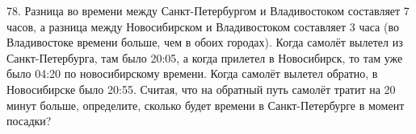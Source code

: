 78. Разница во времени между Санкт-Петербургом и Владивостоком составляет 7 часов, а разница между Новосибирском и Владивостоком составляет 3 часа (во Владивостоке времени больше, чем в обоих городах). Когда самолёт вылетел из Санкт-Петербурга, там было 20:05, а когда прилетел в Новосибирск, то там уже было 04:20 по новосибирскому времени. Когда самолёт вылетел обратно, в Новосибирске было 20:55. Считая, что на обратный путь самолёт тратит на 20 минут больше, определите, сколько будет времени в Санкт-Петербурге в момент посадки?\\
